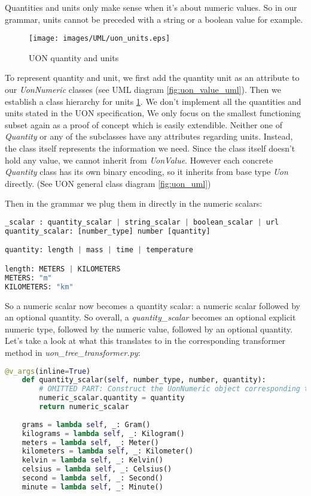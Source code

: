 \documentclass[12pt]{article}
\begin{document}
Quantities and units only make sense when it's about numeric values. So in our grammar, units cannot be preceded with a string or a boolean value for example. 

\begin{figure}[ht!]
 	\centering
 	\caption{UON quantity and units}
 	\texttt{[image: images/UML/uon\_units.eps]}
 	\label{fig:uon_units_uml}
\end{figure}

To represent quantity and unit, we first add the quantity unit as an attribute to our \emph{UonNumeric} classes (see UML diagram \ref{fig:uon_value_uml}). Then we establish a class hierarchy for units \ref{fig:uon_units_uml}. We don't implement all the quantities and units stated in the UON specification, We only focus on the smallest functioning subset again as a proof of concept which is easily extendible. Neither one of \emph{Quantity} or any of the subclasses have any attributes regarding units. Instead, the class itself represents the information we need. Since the class itself doesn't hold any value, we cannot inherit from \emph{UonValue}. However each concrete \emph{Quantity} class has its own binary encoding, so it inherits from base type \emph{Uon} directly. (See UON general class diagram \ref{fig:uon_uml})

Then in the grammar we plug them in directly in the numeric scalars:

\begin{lstlisting}[language=Python]
_scalar : quantity_scalar | string_scalar | boolean_scalar | url
quantity_scalar: [number_type] number [quantity]

quantity: length | mass | time | temperature

length: METERS | KILOMETERS
METERS: "m"
KILOMETERS: "km"
\end{lstlisting}

So a numeric scalar now becomes a quantity scalar: a numeric scalar followed by an optional quantity. So overall, a \emph{quantity\_scalar} becomes an optional explicit numeric type, followed by the numeric value, followed by an optional quantity. Let's take a look at what this translates to in the corresponding transformer method in \emph{uon\_tree\_transformer.py}:

\begin{lstlisting}[language=Python]
@v_args(inline=True)
    def quantity_scalar(self, number_type, number, quantity):
        # OMITTED PART: Construct the UonNumeric object corresponding the number_type
        numeric_scalar.quantity = quantity
        return numeric_scalar
        
    grams = lambda self, _: Gram()
    kilograms = lambda self, _: Kilogram()
    meters = lambda self, _: Meter()
    kilometers = lambda self, _: Kilometer()
    kelvin = lambda self, _: Kelvin()
    celsius = lambda self, _: Celsius()
    second = lambda self, _: Second()
    minute = lambda self, _: Minute()
\end{lstlisting}
\end{document}
